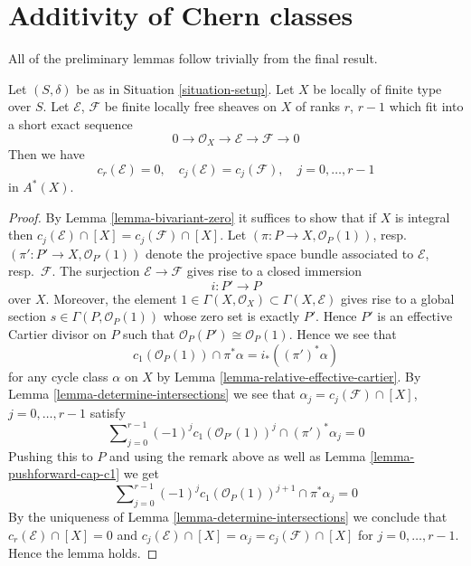 \section{Additivity of Chern classes}
\label{section-additivity-chern-classes}

\noindent
All of the preliminary lemmas follow trivially from the
final result.

\begin{lemma}
\label{lemma-get-rid-of-trivial-subbundle}
Let $(S, \delta)$ be as in Situation \ref{situation-setup}.
Let $X$ be locally of finite type over $S$.
Let $\mathcal{E}$, $\mathcal{F}$ be finite locally free sheaves
on $X$ of ranks $r$, $r - 1$ which fit into a short
exact sequence
$$
0 \to \mathcal{O}_X \to \mathcal{E} \to \mathcal{F} \to 0
$$
Then we have
$$
c_r(\mathcal{E}) = 0, \quad
c_j(\mathcal{E}) = c_j(\mathcal{F}), \quad j = 0, \ldots, r - 1
$$
in $A^*(X)$.
\end{lemma}

\begin{proof}
By Lemma \ref{lemma-bivariant-zero}
it suffices to show that if $X$ is integral
then $c_j(\mathcal{E}) \cap [X] = c_j(\mathcal{F}) \cap [X]$.
Let $(\pi : P \to X, \mathcal{O}_P(1))$,
resp.\ $(\pi' : P' \to X, \mathcal{O}_{P'}(1))$ denote the
projective space bundle associated to $\mathcal{E}$, resp.\ $\mathcal{F}$.
The surjection $\mathcal{E} \to \mathcal{F}$ gives rise
to a closed immersion
$$
i : P' \longrightarrow P
$$
over $X$. Moreover, the element
$1 \in \Gamma(X, \mathcal{O}_X) \subset \Gamma(X, \mathcal{E})$
gives rise to a global section $s \in \Gamma(P, \mathcal{O}_P(1))$
whose zero set is exactly $P'$. Hence $P'$ is an effective Cartier
divisor on $P$ such that $\mathcal{O}_P(P') \cong \mathcal{O}_P(1)$.
Hence we see that
$$
c_1(\mathcal{O}_P(1)) \cap \pi^*\alpha = i_*((\pi')^*\alpha)
$$
for any cycle class $\alpha$ on $X$ by
Lemma \ref{lemma-relative-effective-cartier}.
By Lemma \ref{lemma-determine-intersections} we see that
$\alpha_j = c_j(\mathcal{F}) \cap [X]$, $j = 0, \ldots, r - 1$
satisfy
$$
\sum\nolimits_{j = 0}^{r - 1} (-1)^jc_1(\mathcal{O}_{P'}(1))^j
\cap (\pi')^*\alpha_j = 0
$$
Pushing this to $P$ and using the remark above as well as
Lemma \ref{lemma-pushforward-cap-c1} we get
$$
\sum\nolimits_{j = 0}^{r - 1}
(-1)^j c_1(\mathcal{O}_P(1))^{j + 1}
\cap \pi^*\alpha_j = 0
$$
By the uniqueness of Lemma \ref{lemma-determine-intersections}
we conclude that
$c_r(\mathcal{E}) \cap [X] = 0$ and
$c_j(\mathcal{E}) \cap [X] = \alpha_j = c_j(\mathcal{F}) \cap [X]$
for $j = 0, \ldots, r - 1$. Hence the lemma holds.
\end{proof}


